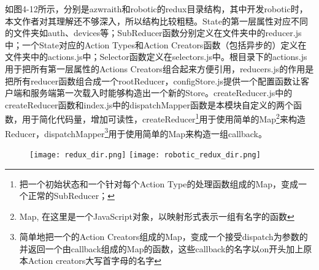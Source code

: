 如图4-12所示，分别是azwraith和robotic的redux目录结构，其中开发robotic时，本文作者对其理解还不够深入，所以结构比较粗糙。State的第一层属性对应不同的文件夹如auth、devices等；SubReducer函数分别定义在文件夹中的reducer.js中；一个State对应的Action Types和Action Creators函数（包括异步的）定义在文件夹中的actions.js中；Selector函数定义在selectors.js中。根目录下的actions.js用于把所有第一层属性的Actions Creators组合起来方便引用，reducers.js的作用是把所有reducer函数组合成一个rootReducer，configStore.js提供一个配置函数让客户端和服务端第一次载入时能够构造出一个新的Store。createReducer.js中的createReducer函数和index.js中的dispatchMapper函数是本模块自定义的两个函数，用于简化代码量，增加可读性，createReducer\footnote{把一个初始状态和一个针对每个Action Type的处理函数组成的Map，变成一个正常的SubReducer；}用于使用简单的Map\footnote{Map, 在这里是一个JavaScript对象，以映射形式表示一组有名字的函数}来构造Reducer，dispatchMapper\footnote{简单地把一个的Action Creators组成的Map，变成一个接受dispatch为参数的并返回一个由callback组成的Map的函数，这些callback的名字以on开头加上原本Action creators大写首字母的名字}用于使用简单的Map来构造一组callback。
\begin{figure}[!htp]
 \centering
 \texttt{[image: redux\_dir.png]}
  \hspace{1cm}
 \texttt{[image: robotic\_redux\_dir.png]}
\end{figure}

